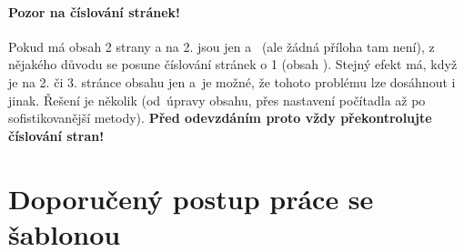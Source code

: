 \paragraph {Pozor na číslování stránek!} Pokud má obsah 2 strany a na 2. jsou jen  a~ (ale žádná příloha tam není), z nějakého důvodu se posune číslování stránek o 1 (obsah ). Stejný efekt má, když je na 2. či 3. stránce obsahu jen  a~je možné, že tohoto problému lze dosáhnout i jinak. Řešení je několik (od~úpravy obsahu, přes nastavení počítadla až po sofistikovanější metody). \textbf{Před odevzdáním proto vždy překontrolujte číslování stran!}


\section*{Doporučený postup práce se šablonou}

